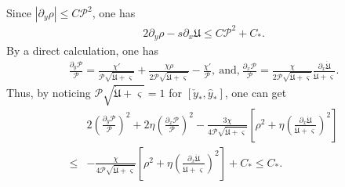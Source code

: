 \documentclass{amsart}
\numberwithin{equation}{section}
\begin{document}
Since $|\partial_{y}\rho|\leq C\mathcal{P}^{2}$, one has
\begin{align}\label{I31}
2\partial_{y}\rho-s\partial_{x}\mathfrak{U}\leq C\mathcal{P}^{2}+C_{*}.
\end{align}
By a direct calculation, one has
\begin{align*}
\frac{\partial_{y}\mathcal{P}}{\mathcal{P}}
= \frac{\chi'}{\mathcal{P}\sqrt{\dot{\mathfrak{U}}+\varsigma}}
 +\frac{\chi\rho}{2\mathcal{P}\sqrt{\dot{\mathfrak{U}}+\varsigma}}
 -\frac{\chi'}{\mathcal{P}},~\text{and,}~
\frac{\partial_{x}\mathcal{P}}{\mathcal{P}}
=\frac{\chi}{2\mathcal{P}\sqrt{\dot{\mathfrak{U}}+\varsigma}}\frac{\partial_{x}\dot{\mathfrak{U}}}{\dot{\mathfrak{U}}+\varsigma}.
\end{align*}
Thus, by noticing $\mathcal{P}\sqrt{\dot{\mathfrak{U}}+\varsigma}=1$ for $[\check{y}_{*},\hat{y}_{*}]$, one can get
\begin{align}\label{I32}
&2\left(\frac{\partial_{y}\mathcal{P}}{\mathcal{P}}\right)^{2}
+2\eta\left(\frac{\partial_{x}\mathcal{P}}{\mathcal{P}}\right)^{2}
-\frac{3\chi}{4\mathcal{P}\sqrt{\dot{\mathfrak{U}}+\varsigma}}\left[\rho^{2}+\eta\left(\frac{\partial_{x}\dot{\mathfrak{U}}}{\dot{\mathfrak{U}}+\varsigma}\right)^{2}\right]\\
\leq&-\frac{\chi}{4\mathcal{P}\sqrt{\dot{\mathfrak{U}}+\varsigma}}\left[\rho^{2}+\eta\left(\frac{\partial_{x}\dot{\mathfrak{U}}}{\dot{\mathfrak{U}}+\varsigma}\right)^{2}\right]
     +C_{*}
\leq C_{*}.\nonumber
\end{align}
\end{document}
